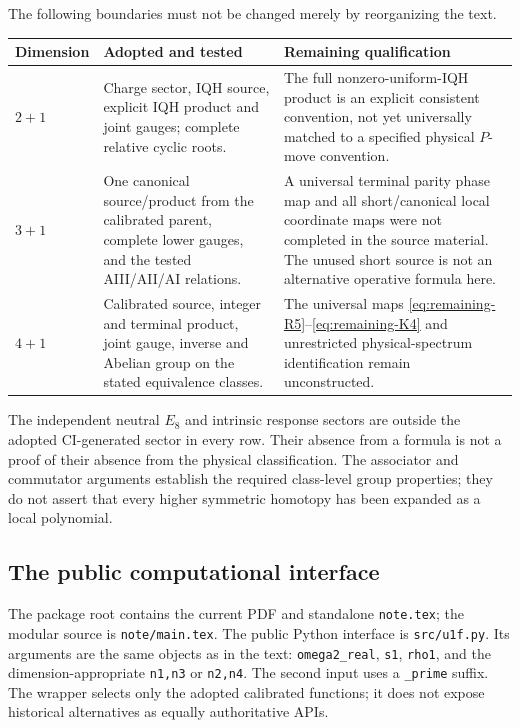 The following boundaries must not be changed merely by reorganizing the text.
\begin{center}
\begin{tabularx}{\textwidth}{@{}lXX@{}}\toprule
Dimension & Adopted and tested & Remaining qualification\\\midrule
$2+1$ & Charge sector, IQH source, explicit IQH product and joint gauges; complete relative cyclic roots. & The full nonzero-uniform-IQH product is an explicit consistent convention, not yet universally matched to a specified physical $P$-move convention.\\[3pt]
$3+1$ & One canonical source/product from the calibrated parent, complete lower gauges, and the tested AIII/AII/AI relations. & A universal terminal parity phase map and all short/canonical local coordinate maps were not completed in the source material. The unused short source is not an alternative operative formula here.\\[3pt]
$4+1$ & Calibrated source, integer and terminal product, joint gauge, inverse and Abelian group on the stated equivalence classes. & The universal maps \eqref{eq:remaining-R5}--\eqref{eq:remaining-K4} and unrestricted physical-spectrum identification remain unconstructed.\\\bottomrule
\end{tabularx}
\end{center}
The independent neutral $E_8$ and intrinsic response sectors are outside the adopted CI-generated sector in every row. Their absence from a formula is not a proof of their absence from the physical classification. The associator and commutator arguments establish the required class-level group properties; they do not assert that every higher symmetric homotopy has been expanded as a local polynomial.

\subsection{The public computational interface}
The package root contains the current PDF and standalone \texttt{note.tex}; the modular source is \texttt{note/main.tex}. The public Python interface is \texttt{src/u1f.py}. Its arguments are the same objects as in the text: \texttt{omega2\_real}, \texttt{s1}, \texttt{rho1}, and the dimension-appropriate \texttt{n1,n3} or \texttt{n2,n4}. The second input uses a \texttt{\_prime} suffix. The wrapper selects only the adopted calibrated functions; it does not expose historical alternatives as equally authoritative APIs.

